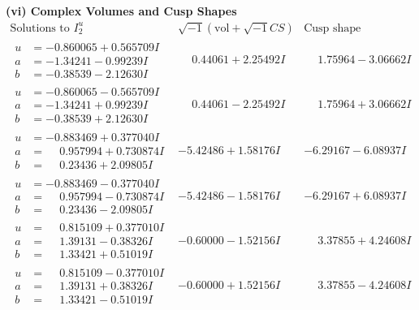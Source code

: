 \documentclass[1p]{elsarticle_modified}
\theoremstyle{definition}
\newcommand{\I}{\sqrt{-1}}
\begin{document}
\newpage\flushleft \textbf{(vi) Complex Volumes and Cusp Shapes}
$$\begin{array}{c|c|c}  
\text{Solutions to }I^u_{2}& \I (\text{vol} + \sqrt{-1}CS) & \text{Cusp shape}\\
 \hline 
\begin{aligned}
u &= -0.860065 + 0.565709 I \\
a &= -1.34241 - 0.99239 I \\
b &= -0.38539 - 2.12630 I\end{aligned}
 & \phantom{-}0.44061 + 2.25492 I & \phantom{-}1.75964 - 3.06662 I \\ \hline\begin{aligned}
u &= -0.860065 - 0.565709 I \\
a &= -1.34241 + 0.99239 I \\
b &= -0.38539 + 2.12630 I\end{aligned}
 & \phantom{-}0.44061 - 2.25492 I & \phantom{-}1.75964 + 3.06662 I \\ \hline\begin{aligned}
u &= -0.883469 + 0.377040 I \\
a &= \phantom{-}0.957994 + 0.730874 I \\
b &= \phantom{-}0.23436 + 2.09805 I\end{aligned}
 & -5.42486 + 1.58176 I & -6.29167 - 6.08937 I \\ \hline\begin{aligned}
u &= -0.883469 - 0.377040 I \\
a &= \phantom{-}0.957994 - 0.730874 I \\
b &= \phantom{-}0.23436 - 2.09805 I\end{aligned}
 & -5.42486 - 1.58176 I & -6.29167 + 6.08937 I \\ \hline\begin{aligned}
u &= \phantom{-}0.815109 + 0.377010 I \\
a &= \phantom{-}1.39131 - 0.38326 I \\
b &= \phantom{-}1.33421 + 0.51019 I\end{aligned}
 & -0.60000 - 1.52156 I & \phantom{-}3.37855 + 4.24608 I \\ \hline\begin{aligned}
u &= \phantom{-}0.815109 - 0.377010 I \\
a &= \phantom{-}1.39131 + 0.38326 I \\
b &= \phantom{-}1.33421 - 0.51019 I\end{aligned}
 & -0.60000 + 1.52156 I & \phantom{-}3.37855 - 4.24608 I \\ \hline\begin{aligned}

\end{aligned}
\end{array}$$
\end{document}
